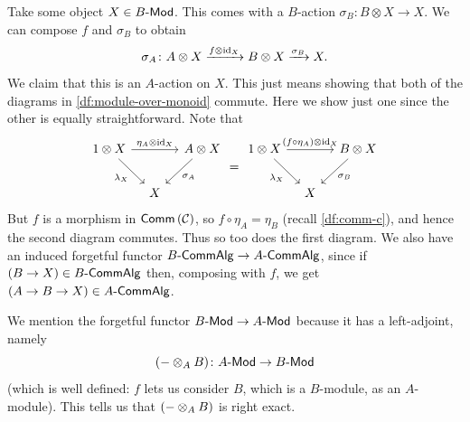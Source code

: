         Take some object $X\in{{B}\hbox{-}\mathsf{Mod}}$.
        This comes with a $B$-action $\sigma_B\colon B\otimes X\to X$.
        We can compose $f$ and $\sigma_B$ to obtain
        \begin{equation*}
            \sigma_A\colon A\otimes X \xrightarrow{f\otimes\operatorname{id}_X} B\otimes X \xrightarrow{\sigma_B} X.
        \end{equation*}
        We claim that this is an $A$-action on $X$.
        This just means showing that both of the diagrams in \cref{df:module-over-monoid} commute.
        Here we show just one since the other is equally straightforward.
        Note that
        \begin{equation*}
            \begin{tikzcd}[row sep=2em,column sep=1em]
                1\otimes X \arrow[rr, "\eta_A\otimes\id_X"] \arrow[dr, swap, "\lambda_X"] & & A\otimes X \arrow[dl, "\sigma_A"]\\
                 & X &
            \end{tikzcd}
            =
            \begin{tikzcd}[row sep=2em,column sep=1em]
                1\otimes X \arrow[rr, "(f\circ\eta_A)\otimes\id_X"] \arrow[dr, swap, "\lambda_X"] & & B\otimes X \arrow[dl, "\sigma_B"]\\
                 & X &
            \end{tikzcd}
        \end{equation*}
        But $f$ is a morphism in $\mathsf{Comm}\left({\mathcal{C}}\right)$, so \mbox{$f\circ\eta_A=\eta_B$} (recall \cref{df:comm-c}), and hence the second diagram commutes.
        Thus so too does the first diagram.
        We also have an induced forgetful functor ${{B}\hbox{-}\mathsf{CommAlg}}\to{{A}\hbox{-}\mathsf{CommAlg}}$, since if $(B\to X)\in{{B}\hbox{-}\mathsf{CommAlg}}$ then, composing with $f$, we get $(A\to B\to X)\in{{A}\hbox{-}\mathsf{CommAlg}}$.
        
        We mention the forgetful functor ${{B}\hbox{-}\mathsf{Mod}}\to{{A}\hbox{-}\mathsf{Mod}}$ because it has a left-adjoint, namely
        \begin{equation*}
            ({-}\otimes_A B)\colon{{A}\hbox{-}\mathsf{Mod}}\to{{B}\hbox{-}\mathsf{Mod}}
        \end{equation*}
        (which is well defined: $f$ lets us consider $B$, which is a $B$-module, as an $A$-module).
        This tells us that $({-}\otimes_A B)$ is right exact.



